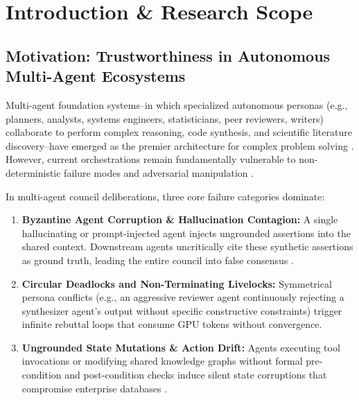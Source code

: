 \documentclass[manuscript,review]{acmart}
\begin{document}
\maketitle






\section{Introduction \& Research Scope}



\subsection{Motivation: Trustworthiness in Autonomous Multi-Agent Ecosystems}


Multi-agent foundation systems--in which specialized autonomous personas (e.g., planners, analysts, systems engineers, statisticians, peer reviewers, writers) collaborate to perform complex reasoning, code synthesis, and scientific literature discovery--have emerged as the premier architecture for complex problem solving \cite{arxiv_2005_14165,arxiv_2405_01543}. However, current orchestrations remain fundamentally vulnerable to non-deterministic failure modes and adversarial manipulation \cite{arxiv_2312_03893}.

In multi-agent council deliberations, three core failure categories dominate:
\begin{enumerate}
  \item \textbf{Byzantine Agent Corruption \& Hallucination Contagion:} A single hallucinating or prompt-injected agent injects ungrounded assertions into the shared context. Downstream agents uncritically cite these synthetic assertions as ground truth, leading the entire council into false consensus \cite{arxiv_2406_00584}.
  \item \textbf{Circular Deadlocks and Non-Terminating Livelocks:} Symmetrical persona conflicts (e.g., an aggressive reviewer agent continuously rejecting a synthesizer agent's output without specific constructive constraints) trigger infinite rebuttal loops that consume GPU tokens without convergence.
  \item \textbf{Ungrounded State Mutations \& Action Drift:} Agents executing tool invocations or modifying shared knowledge graphs without formal pre-condition and post-condition checks induce silent state corruptions that compromise enterprise databases \cite{arxiv_2404_04289}.
\end{enumerate}
\end{document}
